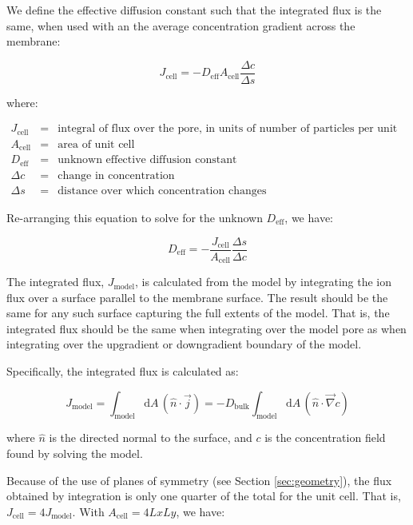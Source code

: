 We define the effective diffusion constant such that the integrated flux is the same,
when used with an the average concentration gradient across the membrane:

\begin{equation}\label{eq:Deff_Jcell}
J_{\mathrm{cell}} = - D_{\mathrm{eff}} A_{\mathrm{cell}} \frac{\Delta c}{\Delta s}
\end{equation}

where:

$\begin{array}{rcl}
J_{\text{cell}} & = & \text{integral of flux over the pore, in units of number of particles per unit time} \\
A_{\text{cell}} & = & \text{area of unit cell} \\
D_{\text{eff}} & = & \text{unknown effective diffusion constant} \\
\Delta c & = & \text{change in concentration} \\
\Delta s & = & \text{distance over which concentration changes}
\end{array}$

Re-arranging this equation to solve for the unknown $D_{\mathrm{eff}}$, we have:

\begin{equation}\label{eq:Deff_def}
D_{\mathrm{eff}} = - \frac{J_{\mathrm{cell}}}{A_{\mathrm{cell}}} \frac{\Delta s}{\Delta c}
\end{equation}

The integrated flux, $J_{\mathrm{model}}$, is calculated from the model by integrating
the ion flux over a surface parallel to the membrane surface.
The result should be the same for any such surface capturing the full extents of the model.
That is, the integrated flux should be the same when integrating over the model pore as
when integrating over the upgradient or downgradient boundary of the model.

Specifically, the integrated flux is calculated as:

\begin{equation}
J_{\mathrm{model}} = \int_{\mathrm{model}} \mathrm{d}A\, \left(\hat{n} \cdot \vec{j} \right)
 = - D_{\mathrm{bulk}} \int_{\mathrm{model}} \mathrm{d}A\, \left(\hat{n} \cdot \vec{\nabla} c \right)
\end{equation}

where $\hat{n}$ is the directed normal to the surface,
and $c$ is the concentration field found by solving the model.

Because of the use of planes of symmetry (see Section \ref{sec:geometry}),
the flux obtained by integration is only one quarter of the total for the unit cell.
That is, $J_{\mathrm{cell}} = 4 J_{\mathrm{model}}$.
With $A_{\mathrm{cell}} = 4 Lx Ly$, we have:

